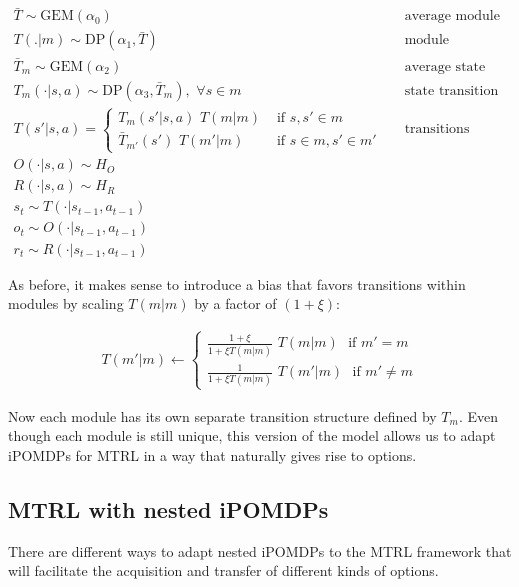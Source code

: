 \documentclass[11pt]{article}
\begin{document}
\begin{align*}
\bar{T} \sim \text{GEM}(\alpha_0)      		&& \text{average module transition distribution}  \\
T(.|m) \sim \text{DP}(\alpha_1, \bar{T})      		&& \text{module transition distributions} \\
\bar{T}_{m} \sim \text{GEM}(\alpha_2)      		&& \text{average state transition distributions} \\
T_m(\cdot|s,a) \sim \text{DP}(\alpha_3, \bar{T}_m) ,\,\,\forall s \in m      		&& \text{state transition distributions} \\
T(s'|s,a) = \begin{cases}  T_m(s'|s,a) \,\, T(m|m) & \text{ if } s, s' \in m \\  \bar{T}_{m'}(s') \,\, T(m'|m) & \text{ if } s \in m, s' \in m'  \end{cases}			&& \text{transitions between all states} \\
O(\cdot | s,a) \sim H_O \\
R(\cdot | s,a) \sim H_R \\
s_t \sim T(\cdot | s_{t-1},a_{t-1}) \\
o_t \sim O(\cdot | s_{t-1}, a_{t-1}) \\
r_t \sim R(\cdot | s_{t-1}, a_{t-1}) 
\end{align*}

As before, it makes sense to introduce a bias that favors transitions within modules by scaling $T(m|m)$ by a factor of $(1 + \xi)$:

\begin{align*}
T(m'|m) \leftarrow \begin{cases}  \frac{1 + \xi}{1 + \xi T(m|m)} \,\, T(m|m) \,\,\text{ if }m' = m    \\  \frac{1}{1 + \xi T(m|m)} \,\, T(m'|m)\,\,\text{ if }m' \ne m  \end{cases}
\end{align*}

Now each module has its own separate transition structure defined by $T_m$. Even though each module is still unique, this version of the model allows us to adapt iPOMDPs for MTRL in a way that naturally gives rise to options.

\subsection{MTRL with nested iPOMDPs}

There are different ways to adapt nested iPOMDPs to the MTRL framework that will facilitate the acquisition and transfer of different kinds of options.
\end{document}

